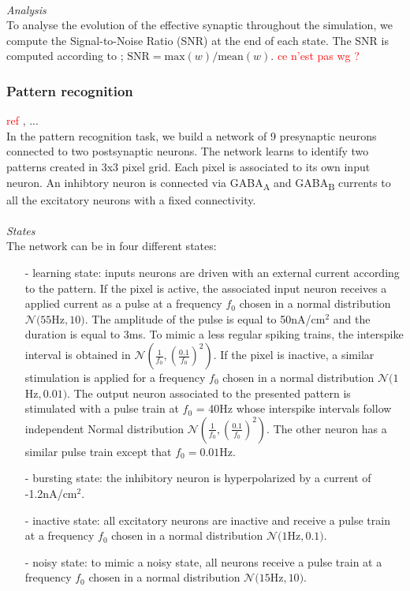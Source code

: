 ~\\
\textit{Analysis}\\
To analyse the evolution of the effective synaptic throughout the simulation, we compute the Signal-to-Noise Ratio (SNR) at the end of each state. The SNR is computed according to \citep{gonzalez-rueda_activity-dependent_2018}; $\mathrm{SNR} = \mathrm{max}(w)/\mathrm{mean}(w)$. \textcolor{red}{ce n'est pas wg ? }



\subsubsection{Pattern recognition}
\textcolor{red}{ref} \citep{fauth_self-organized_2019}, ...\\
In the pattern recognition task, we build a network of 9 presynaptic neurons connected to two postsynaptic neurons. The network learns to identify two patterns created in 3x3 pixel grid. Each pixel is associated to its own input neuron. An inhibtory neuron is connected via GABA\textsubscript{A} and GABA\textsubscript{B} currents to all the excitatory neurons with a fixed connectivity.\\
~\\
\textit{States}\\
The network can be in four different states: 
\begin{itemize}
    \item[-] learning state: inputs neurons are driven with an external current according to the pattern. If the pixel is active, the associated input neuron receives a applied current as a pulse at a frequency $f_0$ chosen in a normal distribution $\mathcal{N}(55$Hz$, 10)$. The amplitude of the pulse is equal to 50nA/cm$^2$ and the duration is equal to 3ms. To mimic a less regular spiking trains, the interspike interval is obtained in $\mathcal{N}(\frac{1}{f_0}, (\frac{\num{0.1}}{f_0})^{2})$. If the pixel is inactive, a similar stimulation is applied for a frequency $f_0$ chosen in a normal distribution $\mathcal{N}(1$Hz$, 0.01)$. The output neuron associated to the presented pattern is stimulated with a pulse train at $f_0$ = 40Hz whose interspike intervals follow independent Normal distribution $\mathcal{N}(\frac{1}{f_0}, (\frac{\num{0.1}}{f_0})^{2})$. The other neuron has a similar pulse train except that $f_0 = 0.01$Hz.  
    \item[-] bursting state: the inhibitory neuron is hyperpolarized by a current of -1.2nA/cm$^2$.
    \item[-] inactive state: all excitatory neurons are inactive and receive a pulse train at a frequency $f_0$ chosen in a normal distribution $\mathcal{N}(1$Hz$, 0.1)$.
    \item[-] noisy state: to mimic a noisy state, all neurons receive a pulse train at a frequency $f_0$ chosen in a normal distribution $\mathcal{N}(15$Hz$, 10)$. 
\end{itemize}
